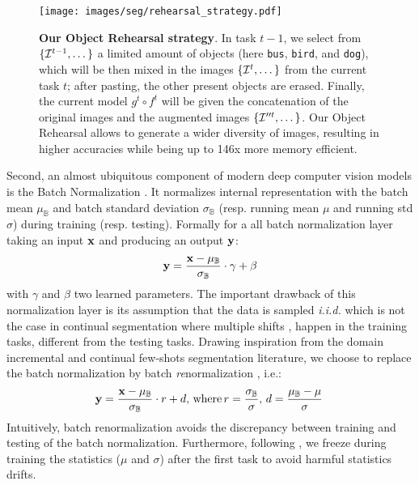 \begin{figure}[ht!]
    \centering
    \texttt{[image: images/seg/rehearsal\_strategy.pdf]}
    \caption{\textbf{Our Object Rehearsal strategy}. In task $t-1$, we select from $\{\mathcal{I}^{t-1},
            \dots \}$ a limited amount of objects (here \texttt{bus}, \texttt{bird}, and
        \texttt{dog}), which will be then mixed in the images $\{\mathcal{I}^{t}, \dots \}$ from the
        current task $t$; after pasting, the other present objects are erased. Finally, the
        current model $g^t \circ f^t$ will be given the concatenation of the original images
        and the augmented images $\{\mathcal{I}''^t, \dots\}$. Our Object Rehearsal allows to generate
        a wider diversity of images, resulting in higher accuracies while being up to 146x more
        memory efficient.}
    \label{fig:seg_model_objectrehearsal}
\end{figure}

Second, an almost ubiquitous component of modern deep computer vision models is the Batch
Normalization \cite{ioffe2015batchnorm}. It normalizes internal representation with the batch mean
$\mu_\mathbb{B}$ and batch standard deviation $\sigma_\mathbb{B}$ (resp. running mean $\mu$ and
running std $\sigma$) during training (resp. testing). Formally for a all batch normalization layer
taking an input $\mathbf{x}$ and producing an output $\mathbf{y}$:
%
\begin{equation}
    \mathbf{y} = \frac{\mathbf{x} - \mu_\mathbb{B}}{\sigma_\mathbb{B}} \cdot \gamma + \beta
    \label{eq:seg_batch_norm}
\end{equation}
%
with $\gamma$ and $\beta$ two learned parameters. The important drawback of this normalization layer
is its assumption that the data is sampled \textit{i.i.d.} which is not the case in continual
segmentation where multiple shifts
\cite{morenotorresa2012datasetshift,lesort2021driftanalysis,douillardlesort2021continuum}, happen in
the training tasks, different from the testing tasks. Drawing inspiration from the domain
incremental \cite{lomonaco2020ar1} and continual few-shots segmentation
\cite{cermelli2020fewshotcontinualsegm} literature, we choose to replace the batch normalization by
batch \textit{re}normalization \cite{ioffe2017batchrenorm}, i.e.:
%
\begin{equation}
    \mathbf{y} = \frac{\mathbf{x} - \mu_\mathbb{B}}{\sigma_\mathbb{B}} \cdot r + d,\,\text{where}\, r = \frac{\sigma_\mathbb{B}}{\sigma},\, d = \frac{\mu_\mathbb{B} - \mu}{\sigma}\,
    \label{eq:seg_batch_renorm}
\end{equation}
%
Intuitively, batch renormalization avoids the discrepancy between training and testing of the batch
normalization. Furthermore, following \cite{cermelli2020fewshotcontinualsegm}, we freeze during
training the statistics ($\mu$ and $\sigma$) after the first task to avoid harmful statistics
drifts.

